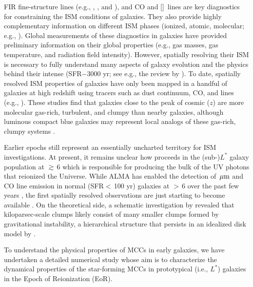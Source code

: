 \IfFileExists{emulateapjlegacy.cls}{\documentclass[iop]{emulateapjlegacy}}{\documentclass[iop]{emulateapj}}
\begin{document}
FIR fine-structure lines (e.g., \cii, \nii, and \oiii), and CO and [\ci]~lines are key diagnostics for constraining the ISM conditions of galaxies. They also provide highly complementary information on different ISM phases (ionized, atomic, molecular; e.g., \citealt{Scoville74a, Rubin85a, Malhotra01a}).
%
Global measurements of these diagnostics in \highz galaxies have provided preliminary information on their global properties (e.g., gas masses, gas temperature, and radiation field intensity). However, spatially resolving their ISM is necessary to fully understand many aspects of galaxy evolution and the physics behind their intense \SF (SFR$-$3000\,\Msun\,yr\pmOne; 
see e.g., the review by \citealt{CW13}).
%
To date, spatially resolved ISM properties of \highz galaxies have only been mapped in a handful of 
galaxies at high redshift using tracers such as dust continuum, CO, and \cii lines (e.g., \citealt{Swinbank11a, Hodge15a, Ferkinhoff15a, 
Hodge16a, Leung19a}). These studies find that galaxies close to the
peak of cosmic \SF ($z$) are more molecular gas-rich, turbulent,
and clumpy than nearby galaxies,
    although luminous compact blue galaxies may represent local
    analogs of these gas-rich, clumpy systems \citep{Garland15}.

Earlier epochs still represent an essentially uncharted territory for ISM investigations. At present, it remains unclear how \SF proceeds in the (sub-)$L^*$ galaxy population at \z$\gtrsim$\,6  which is responsible for producing the bulk of the UV photons that reionized the Universe.
%
While ALMA has enabled the detection of \,$\mbox{$\mu$m}$ and CO line
emission in normal (SFR$<$\,100\,\Msun\,yr\pmOne) galaxies at \z$>$\,6
over the past few years \citep[e.g.,][]{Carniani18b, Odorico18a}, the
first spatially resolved observations are just starting to become
available \citep[e.g., ][]{Jones17a}.
    On the theoretical side, a schematic investigation by
    \citet{Behrendt16} revealed that kiloparsec-scale clumps likely consist
    of many smaller clumps formed by gravitational instability, a hierarchical
    structure that persists in an idealized disk model by \citet{Behrendt19}.

To understand the physical properties of MCCs in early galaxies,
we have undertaken a detailed numerical study whose aim is to characterize the dynamical properties of the star-forming %
MCCs
in prototypical (i.e., $L^*$) galaxies in the Epoch of Reionization (EoR).
\end{document}
